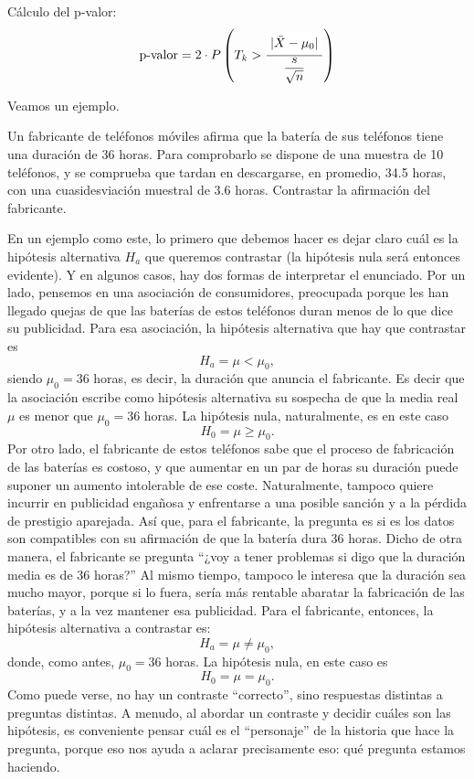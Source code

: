 \begin{enumerate}
        Cálculo del p-valor:
        \begin{equation}\label{cap07:ecu:pValorMediaZBilateral}
        \mbox{p-valor}= 2\cdot P\left(T_k > \dfrac{ \colorbox{white}{$|\bar X-\mu_0|$}}{\dfrac{s}{\sqrt{n}}}\right)
        \end{equation}


    \end{enumerate}

\noindent Veamos un ejemplo.
\begin{ejemplo}\label{cap07:ejem:ContrasteMediaMuestrasPequennas}
Un fabricante de teléfonos móviles afirma que la batería de sus teléfonos tiene una duración de 36 horas. Para comprobarlo se dispone de una muestra de 10 teléfonos, y se comprueba que tardan en descargarse, en promedio, 34.5 horas, con una cuasidesviación muestral de 3.6 horas. Contrastar la afirmación del fabricante.

En un ejemplo como este, lo primero que debemos hacer es dejar claro cuál es la hipótesis alternativa $H_a$ que queremos contrastar (la hipótesis nula será entonces evidente). Y en algunos casos, hay dos formas de interpretar el enunciado. Por un lado, pensemos en una asociación de consumidores, preocupada porque les han llegado quejas de que las baterías de estos teléfonos duran menos de lo que dice su publicidad. Para esa asociación, la hipótesis alternativa que hay que contrastar es
    \[H_a={\mu<\mu_0},\]
siendo $\mu_0=36$ horas, es decir, la duración que anuncia el fabricante. Es decir que la asociación escribe como hipótesis alternativa su sospecha de que la media real $\mu$ es menor que $\mu_0=36$ horas. La hipótesis nula, naturalmente, es en este caso
    \[H_0={\mu\geq \mu_0}.\]
Por otro lado, el fabricante de estos teléfonos sabe que el proceso de fabricación de las baterías es costoso, y que aumentar en un par de horas su duración puede suponer un aumento intolerable de ese coste. Naturalmente, tampoco quiere incurrir en publicidad engañosa y enfrentarse a una posible sanción y a la pérdida de prestigio aparejada. Así que, para el fabricante, la pregunta es si es los datos son compatibles con su afirmación de que la batería dura 36 horas. Dicho de otra manera, el fabricante se pregunta ``¿voy a tener problemas si digo que la duración media es de 36 horas?'' Al mismo tiempo, tampoco le interesa que la duración sea mucho mayor, porque si lo fuera, sería más rentable abaratar la fabricación de las baterías, y a la vez mantener esa publicidad. Para el fabricante, entonces, la hipótesis alternativa a contrastar es:
    \[H_a={\mu\neq \mu_0},\]
donde, como antes, $\mu_0=36$ horas. La hipótesis nula, en este caso es
    \[H_0={\mu = \mu_0}.\]
Como puede verse, no hay un contraste ``correcto'', sino respuestas distintas a preguntas distintas. A menudo, al abordar un contraste y decidir cuáles son las hipótesis, es conveniente pensar cuál es el ``personaje'' de la historia que hace la pregunta, porque eso nos ayuda a aclarar precisamente eso: qué pregunta estamos haciendo.



\end{ejemplo}
